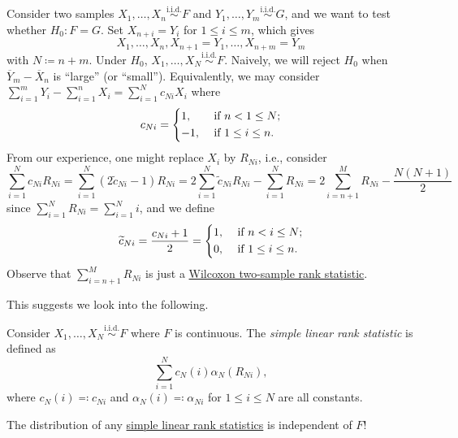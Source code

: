 \begin{eg}
	Consider two samples \(X_1, \dots , X_n \overset{\text{i.i.d.} }{\sim } F\) and \(Y_1, \dots , Y_m \overset{\text{i.i.d.} }{\sim } G\), and we want to test whether \(H_0 \colon F = G\). Set \(X_{n+i} = Y_i\) for \(1 \leq i \leq m\), which gives
	\[
		X_1, \dots , X_n , X_{n+1} = Y_1, \dots , X_{n+m} = Y_m
	\]
	with \(N \coloneqq n + m\). Under \(H_0\), \(X_1, \dots , X_N \overset{\text{i.i.d.} }{\sim } F\). Naively, we will reject \(H_0\) when \(\overline{Y} _m - \overline{X} _n\) is ``large'' (or ``small''). Equivalently, we may consider \(\sum_{i=1}^{m} Y_i - \sum_{i=1}^{n} X_i = \sum_{i=1}^{N} c_{Ni} X_i\) where
	\[
		c_{Ni}
		= \begin{dcases}
			1,  & \text{ if } n < 1 \leq N ;   \\
			-1, & \text{ if } 1 \leq i \leq n.
		\end{dcases}
	\]
	From our experience, one might replace \(X_i\) by \(R_{Ni}\), i.e., consider
	\[
		\sum_{i=1}^{N} c_{Ni} R_{Ni}
		= \sum_{i=1}^{N} (2 \widetilde{c} _{Ni} - 1) R_{Ni}
		= 2 \sum_{i=1}^{N} \widetilde{c} _{Ni} R_{Ni} - \sum_{i=1}^{N} R_{Ni}
		= 2 \sum_{i=n+1}^{M} R_{Ni} - \frac{N(N+1)}{2}
	\]
	since \(\sum_{i=1}^{N} R_{Ni} = \sum_{i=1}^{N} i\), and we define
	\[
		\widetilde{c} _{Ni}
		= \frac{c_{Ni} + 1}{2}
		= \begin{dcases}
			1, & \text{ if } n < i \leq N ;   \\
			0, & \text{ if } 1 \leq i \leq n.
		\end{dcases}
	\]
	Observe that \(\sum_{i=n+1}^{M} R_{Ni}\) is just a \hyperref[def:Wilcoxon-signed-rank-statistic]{Wilcoxon two-sample rank statistic}.
\end{eg}

This suggests we look into the following.

\begin{definition}\label{def:simple-linrea-rank-statistic}
	Consider \(X_1, \dots , X_N \overset{\text{i.i.d.} }{\sim } F\) where \(F\) is continuous. The \emph{simple linear rank statistic} is defined as
	\[
		\sum_{i=1}^{N} c_N(i) \alpha _N(R_{Ni}),
	\]
	where \(c_N(i) \eqqcolon c_{Ni}\) and \(\alpha _N(i) \eqqcolon \alpha _{Ni}\) for \(1 \leq i \leq N\) are all constants.
\end{definition}

\begin{remark}
	The distribution of any \hyperref[def:simple-linrea-rank-statistic]{simple linear rank statistics} is independent of \(F\)!
\end{remark}

